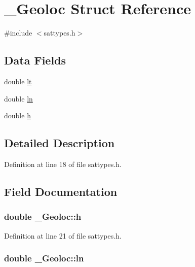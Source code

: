 \hypertarget{struct___geoloc}{\section{\-\_\-\-Geoloc Struct Reference}
\label{struct___geoloc}
}


{\ttfamily \#include $<$sattypes.\-h$>$}

\subsection*{Data Fields}
\begin{DoxyCompactItemize}
\item 
double \hyperlink{struct___geoloc_a536e2886145996c4c5cbe460217fe927}{lt}
\item 
double \hyperlink{struct___geoloc_a702f540a53c540f32ff231b7266e15b4}{ln}
\item 
double \hyperlink{struct___geoloc_a4797f8e72247abef043af6c15d0c9f9b}{h}
\end{DoxyCompactItemize}


\subsection{Detailed Description}


Definition at line 18 of file sattypes.\-h.



\subsection{Field Documentation}
\hypertarget{struct___geoloc_a4797f8e72247abef043af6c15d0c9f9b}{
\subsubsection[{h}]{\setlength{\rightskip}{0pt plus 5cm}double \-\_\-\-Geoloc\-::h}}\label{struct___geoloc_a4797f8e72247abef043af6c15d0c9f9b}


Definition at line 21 of file sattypes.\-h.

\hypertarget{struct___geoloc_a702f540a53c540f32ff231b7266e15b4}{
\subsubsection[{ln}]{\setlength{\rightskip}{0pt plus 5cm}double \-\_\-\-Geoloc\-::ln}}\label{struct___geoloc_a702f540a53c540f32ff231b7266e15b4}



